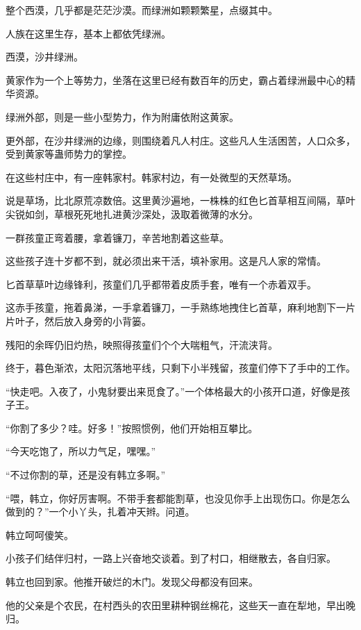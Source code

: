 
\begin{this_body}



整个西漠，几乎都是茫茫沙漠。而绿洲如颗颗繁星，点缀其中。

人族在这里生存，基本上都依凭绿洲。

西漠，沙井绿洲。

黄家作为一个上等势力，坐落在这里已经有数百年的历史，霸占着绿洲最中心的精华资源。

绿洲外部，则是一些小型势力，作为附庸依附这黄家。

更外部，在沙井绿洲的边缘，则围绕着凡人村庄。这些凡人生活困苦，人口众多，受到黄家等蛊师势力的掌控。

在这些村庄中，有一座韩家村。韩家村边，有一处微型的天然草场。

说是草场，比北原荒凉数倍。这里黄沙遍地，一株株的红色匕首草相互间隔，草叶尖锐如剑，草根死死地扎进黄沙深处，汲取着微薄的水分。

一群孩童正弯着腰，拿着镰刀，辛苦地割着这些草。

这些孩子连十岁都不到，就必须出来干活，填补家用。这是凡人家的常情。

匕首草草叶边缘锋利，孩童们几乎都带着皮质手套，唯有一个赤着双手。

这赤手孩童，拖着鼻涕，一手拿着镰刀，一手熟练地拽住匕首草，麻利地割下一片片叶子，然后放入身旁的小背篓。

残阳的余晖仍旧灼热，映照得孩童们个个大喘粗气，汗流浃背。

终于，暮色渐浓，太阳沉落地平线，只剩下小半残留，孩童们停下了手中的工作。

“快走吧。入夜了，小鬼豺要出来觅食了。”一个体格最大的小孩开口道，好像是孩子王。

“你割了多少？哇。好多！”按照惯例，他们开始相互攀比。

“今天吃饱了，所以力气足，嘿嘿。”

“不过你割的草，还是没有韩立多啊。”

“喂，韩立，你好厉害啊。不带手套都能割草，也没见你手上出现伤口。你是怎么做到的？”一个小丫头，扎着冲天辫。问道。

韩立呵呵傻笑。

小孩子们结伴归村，一路上兴奋地交谈着。到了村口，相继散去，各自归家。

韩立也回到家。他推开破烂的木门。发现父母都没有回来。

他的父亲是个农民，在村西头的农田里耕种钢丝棉花，这些天一直在犁地，早出晚归。


\end{this_body}
